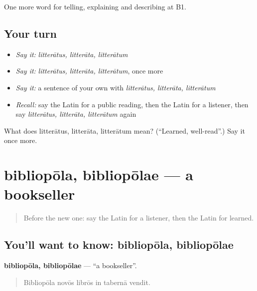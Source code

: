 \begin{grammarlens}[title={What you've built}]
One more word for telling, explaining and describing at B1.
\end{grammarlens}

\subsection*{Your turn}
\begin{itemize}
\raggedright
  \item \emph{Say it:} \emph{litterātus, litterāta, litterātum}
  \item \emph{Say it:} \emph{litterātus, litterāta, litterātum}, once more
  \item \emph{Say it:} a sentence of your own with \emph{litterātus, litterāta, litterātum}
  \item \emph{Recall:} say the Latin for a public reading, then the Latin for a listener, then say \emph{litterātus, litterāta, litterātum} again
\end{itemize}

\begin{tcolorbox}[breakable,colback=teal!4,colframe=teal!35!black,title={Before you move on}]
What does litterātus, litterāta, litterātum mean? (\textquotedblleft{}Learned, well-read\textquotedblright{}.) Say it once more.
\end{tcolorbox}
\section[bibliopōla, bibliopōlae]{bibliopōla, bibliopōlae — a bookseller}

\label{lesson:LA-C550-bibliopola}



\begin{quote}
Before the new one: say the Latin for a listener, then the Latin for learned.
\end{quote}

\subsection*{You'll want to know: bibliopōla, bibliopōlae}
\textbf{bibliopōla, bibliopōlae} — \textquotedblleft{}a bookseller\textquotedblright{}.

\begin{quote}
Bibliopōla novōs librōs in tabernā vendit.
\end{quote}

